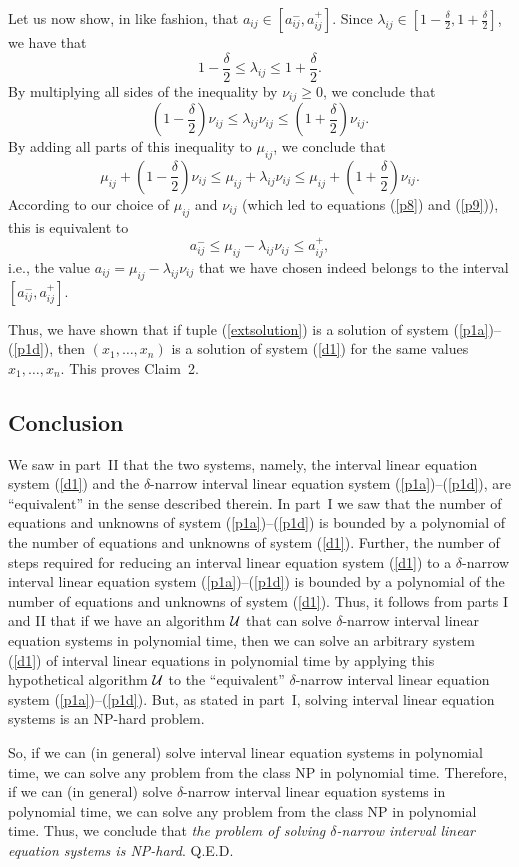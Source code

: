 Let us now show, in like fashion, that $a_{ij}\in[a_{ij}^-,a_{ij}^+]$.  Since
$\lambda_{ij}\in[1-{\displaystyle\frac{\delta}{2}},1+{\displaystyle\frac
{\delta}{2}}]$, we have that
$$
  1-\frac{\delta}{2} \leq \lambda_{ij} \leq 1+\frac{\delta}{2}.
$$
By multiplying all sides of the inequality by $\nu_{ij}\geq 0$, we conclude
that
$$
  (1-\frac{\delta}{2})\nu_{ij} \leq \lambda_{ij}\nu_{ij} \leq
   (1+\frac{\delta}{2})\nu_{ij}.
$$
By adding all parts of this inequality to $\mu_{ij}$, we conclude that
$$
  \mu_{ij}+(1-\frac{\delta}{2})\nu_{ij}\leq\mu_{ij}+\lambda_{ij}\nu_{ij} \leq
   \mu_{ij}+(1+\frac{\delta}{2})\nu_{ij}.
$$
According to our choice of $\mu_{ij}$ and $\nu_{ij}$ (which led to equations
(\ref{p8}) and (\ref{p9})), this is equivalent to
$$
  a_{ij}^- \leq \mu_{ij}-\lambda_{ij}\nu_{ij} \leq a_{ij}^+,
$$
i.e., the value $a_{ij}=\mu_{ij}-\lambda_{ij}\nu_{ij}$ that we have chosen
indeed belongs to the interval $[a_{ij}^-,a_{ij}^+]$.

Thus, we have shown that if tuple (\ref{extsolution}) is a solution of system
(\ref{p1a})--(\ref{p1d}), then $(x_1,\ldots,x_n)$ is a solution of system
(\ref{d1}) for the same values $x_1,\ldots,x_n$.  This proves Claim~2.

\newpage
\subsection{Conclusion}

\noindent
We saw in part~II that the two systems, namely, the interval linear
equation system (\ref{d1}) and the $\delta$-narrow interval linear equation
system (\ref{p1a})--(\ref{p1d}), are ``equivalent'' in the sense described
therein.  In part~I we saw that the number of equations and unknowns of system
(\ref{p1a})--(\ref{p1d}) is bounded by a polynomial of the number of equations
and unknowns of system (\ref{d1}).  Further, the number of steps required for 
reducing an interval linear equation system (\ref{d1}) to a $\delta$-narrow 
interval linear equation system (\ref{p1a})--(\ref{p1d}) is bounded by a 
polynomial of the number of equations and unknowns of system (\ref{d1}).  
Thus, it follows from parts I and II that if we have an algorithm $\cal U$ 
that can solve $\delta$-narrow interval linear equation systems in polynomial 
time, then we can solve an arbitrary
system (\ref{d1}) of interval linear equations in polynomial time by applying
this hypothetical algorithm $\cal U$ to the ``equivalent'' $\delta$-narrow
interval linear equation system (\ref{p1a})--(\ref{p1d}).  But, as stated in
part~I, solving interval linear equation systems is an NP-hard problem.

So, if we can (in general) solve interval linear equation systems in
polynomial time, we can solve any problem from the class NP in polynomial time.
Therefore, if we can (in general) solve $\delta$-narrow interval linear
equation systems in polynomial time, we can solve any problem from the class
NP in polynomial time.  Thus, we conclude that {\em the problem of solving
$\delta$-narrow interval linear equation systems is\/ {\rm NP}-hard}. Q.E.D.
